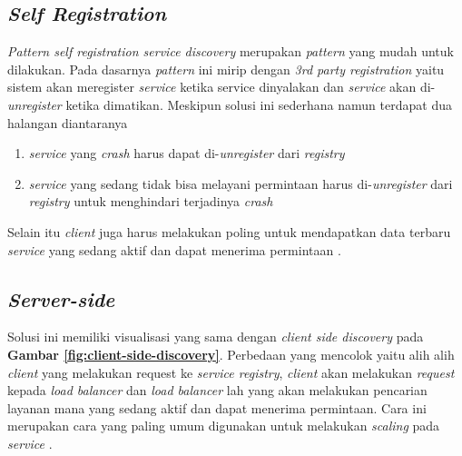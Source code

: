 \subsection{\textit{Self Registration}}
\textit{Pattern self registration service discovery} merupakan \textit{pattern} yang mudah untuk dilakukan. Pada dasarnya \textit{pattern} ini mirip dengan \textit{3rd party registration} yaitu sistem akan meregister \textit{service} ketika service dinyalakan dan \textit{service} akan di-\textit{unregister} ketika dimatikan. Meskipun solusi ini sederhana namun terdapat dua halangan diantaranya

\begin{enumerate}
  \item \textit{service} yang \textit{crash} harus dapat di-\textit{unregister} dari \textit{registry}
  \item \textit{service} yang sedang tidak bisa melayani permintaan harus di-\textit{unregister} dari \textit{registry} untuk menghindari terjadinya \textit{crash}
\end{enumerate}

Selain itu \textit{client} juga harus melakukan poling untuk mendapatkan data terbaru \textit{service} yang sedang aktif dan dapat menerima permintaan \parencite{selfregistration}.

\subsection{\textit{Server-side}}
Solusi ini memiliki visualisasi yang sama dengan \textit{client side discovery} pada \textbf{Gambar \ref{fig:client-side-discovery}}. Perbedaan yang mencolok yaitu alih alih \textit{client} yang melakukan request ke \textit{service registry}, \textit{client} akan melakukan \textit{request} kepada \textit{load balancer} dan \textit{load balancer} lah yang akan melakukan pencarian layanan mana yang sedang aktif dan dapat menerima permintaan. Cara ini merupakan cara yang paling umum digunakan untuk melakukan \textit{scaling} pada \textit{service} \parencite{servicesidediscovery}.
